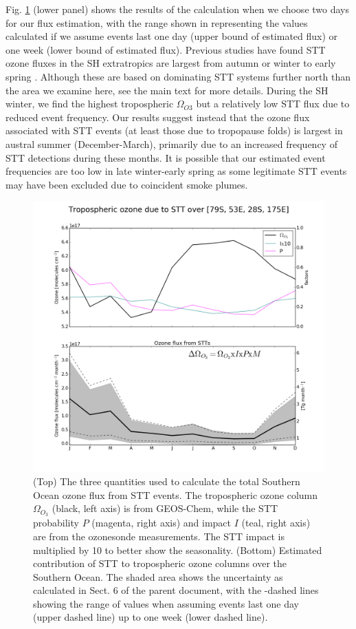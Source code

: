     Fig. \ref{fig:SOExtrapolation} (lower panel) shows the results of the calculation when we choose two days for our flux estimation, with the range shown in representing the values calculated if we assume events last one day (upper bound of estimated flux) or one week (lower bound of estimated flux).
    Previous studies have found STT ozone fluxes in the SH extratropics are largest from autumn or winter to early spring \citep{Olsen2003, Skerlak2015, Liu2016}.
    Although these are based on dominating STT systems further north than the area we examine here, see the main text for more details.
    During the SH winter, we find the highest tropospheric $\Omega_{O3}$ but a relatively low STT flux due to reduced event frequency.
    Our results suggest instead that the ozone flux associated with STT events (at least those due to tropopause folds) is largest in austral summer (December-March), primarily due to an increased frequency of STT detections during these months.
    It is possible that our estimated event frequencies are too low in late winter-early spring as some legitimate STT events may have been excluded due to coincident smoke plumes.
    
    \begin{figure}[t]
      \includegraphics[width=12.0cm]{../figures/STT_extrapolation_SO.png}
      \caption{%
	(Top) The three quantities used to calculate the total Southern Ocean ozone flux from STT events.
	The tropospheric ozone column $\Omega_{O_3}$ (black, left axis) is from GEOS-Chem, while the STT probability $P$ (magenta, right axis) and impact $I$ (teal, right axis) are from the ozonesonde measurements.
	The STT impact is multiplied by 10 to better show the seasonality.
	(Bottom) Estimated contribution of STT to tropospheric ozone columns over the Southern Ocean.
	The shaded area shows the uncertainty as calculated in Sect. 6 of the parent document, with the -dashed lines showing the range of values when assuming events last one day (upper dashed line) up to one week (lower dashed line).}
      \label{fig:SOExtrapolation}
    \end{figure}
    
